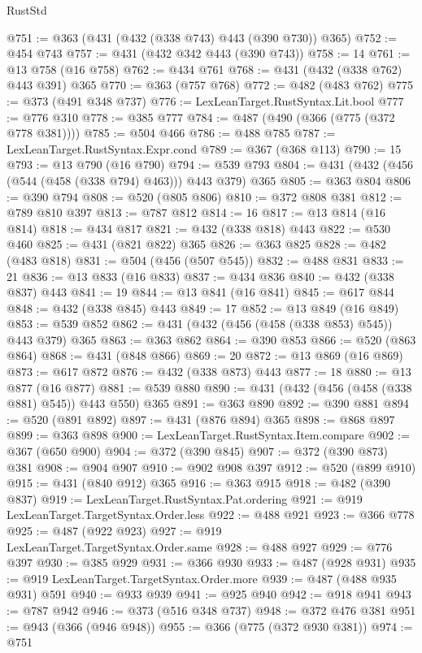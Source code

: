 \begin{lexlean}{RustStd}
\begin{coremodule}
@751 := @363 (@431 (@432 (@338 @743) @443 (@390 @730)) @365)
@752 := @454 @743
@757 := @431 (@432 @342 @443 (@390 @743))
@758 := 14
@761 := @13 @758 (@16 @758)
@762 := @434 @761
@768 := @431 (@432 (@338 @762) @443 @391) @365
@770 := @363 (@757 @768)
@772 := @482 (@483 @762)
@775 := @373 (@491 @348 @737)
@776 := LexLeanTarget.RustSyntax.Lit.bool
@777 := @776 @310
@778 := @385 @777
@784 := @487 (@490 (@366 (@775 (@372 @778 @381))))
@785 := @504 @466
@786 := @488 @785
@787 := LexLeanTarget.RustSyntax.Expr.cond
@789 := @367 (@368 @113)
@790 := 15
@793 := @13 @790 (@16 @790)
@794 := @539 @793
@804 := @431 (@432 (@456 (@544 (@458 (@338 @794) @463))) @443 @379) @365
@805 := @363 @804
@806 := @390 @794
@808 := @520 (@805 @806)
@810 := @372 @808 @381
@812 := @789 @810 @397
@813 := @787 @812
@814 := 16
@817 := @13 @814 (@16 @814)
@818 := @434 @817
@821 := @432 (@338 @818) @443
@822 := @530 @460
@825 := @431 (@821 @822) @365
@826 := @363 @825
@828 := @482 (@483 @818)
@831 := @504 (@456 (@507 @545))
@832 := @488 @831
@833 := 21
@836 := @13 @833 (@16 @833)
@837 := @434 @836
@840 := @432 (@338 @837) @443
@841 := 19
@844 := @13 @841 (@16 @841)
@845 := @617 @844
@848 := @432 (@338 @845) @443
@849 := 17
@852 := @13 @849 (@16 @849)
@853 := @539 @852
@862 := @431 (@432 (@456 (@458 (@338 @853) @545)) @443 @379) @365
@863 := @363 @862
@864 := @390 @853
@866 := @520 (@863 @864)
@868 := @431 (@848 @866)
@869 := 20
@872 := @13 @869 (@16 @869)
@873 := @617 @872
@876 := @432 (@338 @873) @443
@877 := 18
@880 := @13 @877 (@16 @877)
@881 := @539 @880
@890 := @431 (@432 (@456 (@458 (@338 @881) @545)) @443 @550) @365
@891 := @363 @890
@892 := @390 @881
@894 := @520 (@891 @892)
@897 := @431 (@876 @894) @365
@898 := @868 @897
@899 := @363 @898
@900 := LexLeanTarget.RustSyntax.Item.compare
@902 := @367 (@650 @900)
@904 := @372 (@390 @845)
@907 := @372 (@390 @873) @381
@908 := @904 @907
@910 := @902 @908 @397
@912 := @520 (@899 @910)
@915 := @431 (@840 @912) @365
@916 := @363 @915
@918 := @482 (@390 @837)
@919 := LexLeanTarget.RustSyntax.Pat.ordering
@921 := @919 LexLeanTarget.TargetSyntax.Order.less
@922 := @488 @921
@923 := @366 @778
@925 := @487 (@922 @923)
@927 := @919 LexLeanTarget.TargetSyntax.Order.same
@928 := @488 @927
@929 := @776 @397
@930 := @385 @929
@931 := @366 @930
@933 := @487 (@928 @931)
@935 := @919 LexLeanTarget.TargetSyntax.Order.more
@939 := @487 (@488 @935 @931) @591
@940 := @933 @939
@941 := @925 @940
@942 := @918 @941
@943 := @787 @942
@946 := @373 (@516 @348 @737)
@948 := @372 @476 @381
@951 := @943 (@366 (@946 @948))
@955 := @366 (@775 (@372 @930 @381))
@974 := @751

\end{coremodule}
\end{lexlean}
